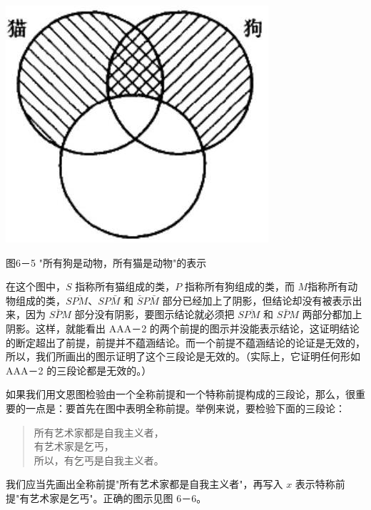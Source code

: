 \begin{center}
\includegraphics[width=\textwidth]{images/2025_05_15_6a28331d5e7c993ad07ag-276.jpg}

图6－5 "所有狗是动物，所有猫是动物"的表示
\end{center}

在这个图中，$S$ 指称所有猫组成的类，$P$ 指称所有狗组成的类，而 $M$指称所有动物组成的类，$S\overline{PM}$、$SP\bar{M}$ 和 $\bar{S}P\bar{M}$ 部分已经加上了阴影，但结论却没有被表示出来，因为 $S\bar{P}M$ 部分没有阴影，要图示结论就必须把 $S\overline{PM}$ 和 $S\bar{P}M$ 两部分都加上阴影。这样，就能看出 AAA－2 的两个前提的图示并没能表示结论，这证明结论的断定超出了前提，前提并不蕴涵结论。而一个前提不蕴涵结论的论证是无效的，所以，我们所画出的图示证明了这个三段论是无效的。（实际上，它证明任何形如 AAA－2 的三段论都是无效的。）

如果我们用文恩图检验由一个全称前提和一个特称前提构成的三段论，那么，很重要的一点是：要首先在图中表明全称前提。举例来说，要检验下面的三段论：

\begin{quote}
所有艺术家都是自我主义者，\\
有艺术家是乞丐，\\
所以，有乞丐是自我主义者。
\end{quote}

我们应当先画出全称前提"所有艺术家都是自我主义者"，再写入 $x$ 表示特称前提"有艺术家是乞丐"。正确的图示见图 6－6。

